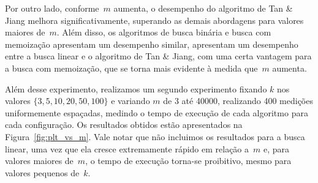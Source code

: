\documentclass[11pt]{article}
\begin{document}
Por outro lado, conforme~\(m\) aumenta, o desempenho do algoritmo de Tan \& Jiang melhora significativamente, superando as demais abordagens para valores maiores de~\(m\). Além disso, os algoritmos de busca binária e busca com memoização apresentam um desempenho similar, apresentam um desempenho entre a busca linear e o algoritmo de Tan \& Jiang, com uma certa vantagem para a busca com memoização, que se torna mais evidente à medida que~\(m\) aumenta.

Além desse experimento, realizamos um segundo experimento fixando \(k\) nos valores \(\{3, 5, 10, 20, 50, 100\}\) e variando \(m\) de 3 até 40000, realizando 400 medições uniformemente espaçadas, medindo o tempo de execução de cada algoritmo para cada configuração. Os resultados obtidos estão apresentados na Figura~\ref{fig:plt_vs_m}. Vale notar que não incluimos os resultados para a busca linear, uma vez que ela cresce extremamente rápido em relação a~\(m\) e, para valores maiores de~\(m\), o tempo de execução torna-se proibitivo, mesmo para valores pequenos de~\(k\).
\end{document}
